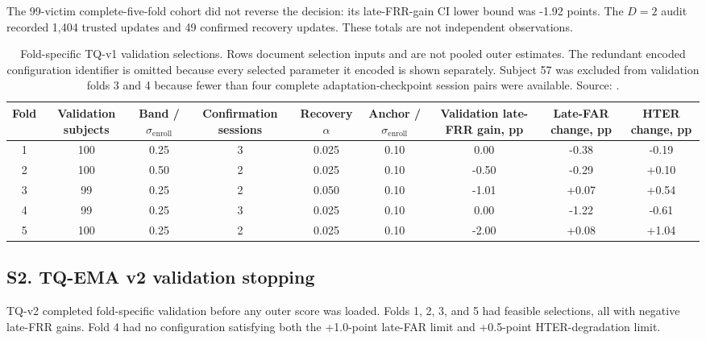 \documentclass[technologies,supfile,submit,moreauthors]{Definitions/mdpi}
\begin{document}
The 99-victim complete-five-fold cohort did not reverse the decision: its late-FRR-gain CI lower bound was -1.92 points. The \(D=2\) audit recorded 1,404 trusted updates and 49 confirmed recovery updates. These totals are not independent observations.

\startlandscape
\begin{table}[H]
\caption{Fold-specific TQ-v1 validation selections. Rows document selection inputs and are not pooled outer estimates. The redundant encoded configuration identifier is omitted because every selected parameter it encoded is shown separately. Subject 57 was excluded from validation folds 3 and 4 because fewer than four complete adaptation-checkpoint session pairs were available. Source: \protect{}.\label{tab:s1}}
\footnotesize
\setlength{\tabcolsep}{3pt}
\renewcommand{\arraystretch}{1.2}
\begin{tabularx}{\textwidth}{c c c c c c c c c}
\toprule
\textbf{Fold} & \textbf{Validation subjects} & \textbf{Band / \(\sigma_{\mathrm{enroll}}\)} & \textbf{Confirmation sessions} & \textbf{Recovery \(\alpha\)} & \textbf{Anchor / \(\sigma_{\mathrm{enroll}}\)} & \textbf{Validation late-FRR gain, pp} & \textbf{Late-FAR change, pp} & \textbf{HTER change, pp} \\
\midrule
1 & 100 & 0.25 & 3 & 0.025 & 0.10 & 0.00 & -0.38 & -0.19 \\
2 & 100 & 0.50 & 2 & 0.025 & 0.10 & -0.50 & -0.29 & +0.10 \\
3 & 99 & 0.25 & 2 & 0.050 & 0.10 & -1.01 & +0.07 & +0.54 \\
4 & 99 & 0.25 & 3 & 0.025 & 0.10 & 0.00 & -1.22 & -0.61 \\
5 & 100 & 0.25 & 2 & 0.025 & 0.10 & -2.00 & +0.08 & +1.04 \\
\bottomrule
\end{tabularx}
\end{table}
\finishlandscape

\subsection*{S2. TQ-EMA v2 validation stopping}\label{sr:s2}

TQ-v2 completed fold-specific validation before any outer score was loaded. Folds 1, 2, 3, and 5 had feasible selections, all with negative late-FRR gains. Fold 4 had no configuration satisfying both the +1.0-point late-FAR limit and +0.5-point HTER-degradation limit.
\end{document}

